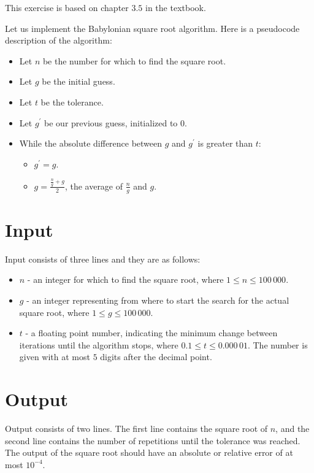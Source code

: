 This exercise is based on chapter $3.5$ in the textbook.

Let us implement the Babylonian square root algorithm.
Here is a pseudocode description of the algorithm:
    \begin{itemize}
        \item Let $n$ be the number for which to find the square root.
        \item Let $g$ be the initial guess.
        \item Let $t$ be the tolerance.
        \item Let $g^\prime$ be our previous guess, initialized to $0$.
        \item While the absolute difference between $g$ and $g^\prime$ is greater than $t$:
            \begin{itemize}
                \item $g^\prime = g$.
                \item $g =\frac{\frac{n}{g} + g}{2}$, the average of $\frac{n}{g}$ and $g$.
            \end{itemize}
    \end{itemize}

\section*{Input}
Input consists of three lines and they are as follows:

    \begin{itemize}
        \item $n$ - an integer for which to find the square root, where $1 \leq n \leq 100\,000$.
        \item $g$ - an integer representing from where to start the search for the actual square root, where $1 \leq g \leq 100\,000$.
        \item $t$ - a floating point number, indicating the minimum change between iterations until the algorithm stops, where $0.1 \leq t \leq 0.000\,01$. The number is given with at most $5$ digits after the decimal point.
    \end{itemize}

\section*{Output}
Output consists of two lines.
The first line contains the square root of $n$,
and the second line contains the number of repetitions until the tolerance was reached.
The output of the square root should have an absolute or relative error of at most $10^{-4}$.
